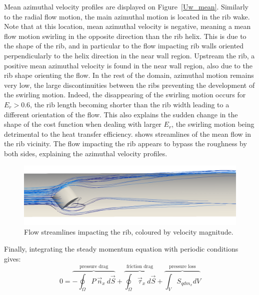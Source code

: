 Mean azimuthal velocity profiles are displayed on Figure~\ref{Uw_mean}. Similarly to the radial flow motion, the main azimuthal motion is located in the rib wake. Note that at this location, mean azimuthal velocity is negative, meaning a mean flow motion swirling in the opposite direction than the rib helix. This is due to the shape of the rib, and in particular to the flow impacting rib walls oriented perpendicularly to the helix direction in the near wall region. Upstream the rib, a positive mean azimuthal velocity is found in the near wall region, also due to the rib shape orienting the flow. In the rest of the domain, azimuthal motion remains very low, the large discontinuities between the ribs preventing the development of the swirling motion. Indeed, the disappearing of the swirling motion occurs for $E_r > 0.6$, the rib length becoming shorter than the rib width leading to a different orientation of the flow. This also explains the sudden change in the shape of the cost function when dealing with larger $E_r$, the swirling motion being detrimental to the heat transfer efficiency.  shows streamlines of the mean flow in the rib vicinity. The flow impacting the rib appears to bypass the roughness by both sides, explaining the azimuthal velocity profiles.

\begin{figure}[!h]
\centering
\includegraphics[width=\linewidth]{fig/applications/optim/Streamlines.png}
\caption{Flow streamlines impacting the rib, coloured by velocity magnitude.}
\label{streamlines}
\end{figure}

Finally, integrating the steady momentum equation with periodic conditions gives:
\begin{equation}
0 = \overbrace{- \oint_{\Omega} P ~ \vec{n}_x ~ d\vec{S}}^{\text{pressure drag}} + \overbrace{\oint_{\Omega} \vec{\tau}_x ~ d\vec{S}}^{\text{friction drag}} + \overbrace{\int_V S_{qdm_x} dV}^{\text{pressure loss}}
\label{momentum_eq}
\end{equation}

